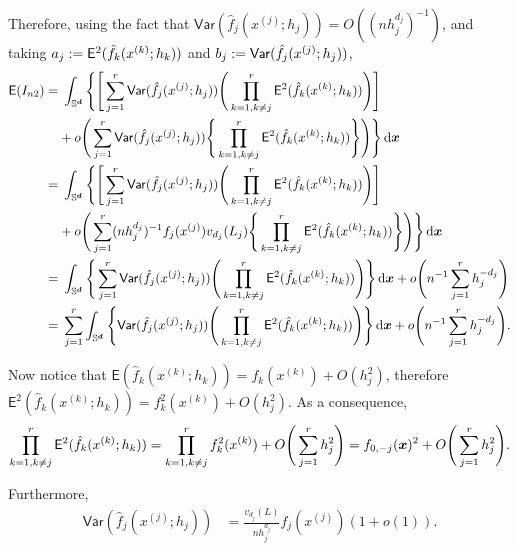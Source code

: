 \documentclass{article}
\begin{document}
Therefore, using the fact that $\mathsf{Var} (\hat{f}_j(x^{(j)};h_j)) = O((n h_j^{d_j})^{-1})$, and taking $a_j := \mathsf{E}^2 (\hat{f}_k(x^{(k)};h_k))$ and $b_j := \mathsf{Var} (\hat{f}_j(x^{(j)};h_j))$,
\begin{align*}
     \mathsf{E} (I_{n2}) =&\; \int_{\mathbb{S}^{\boldsymbol{d}}} \Bigg\{ \Bigg[ \sum_{j=1}^{r} \mathsf{Var} (\hat{f}_j(x^{(j)};h_j)) \Bigg( \prod_{k=1,k \ne j}^{r} \mathsf{E}^2 (\hat{f}_k(x^{(k)};h_k)) \Bigg) \Bigg] \\
     & + o \Bigg( \sum_{j=1}^{r} \mathsf{Var} (\hat{f}_j(x^{(j)};h_j)) \Bigg\{ \prod_{k=1,k \ne j}^{r} \mathsf{E}^2 (\hat{f}_k(x^{(k)};h_k)) \Bigg\} \Bigg) \Bigg\} \,\mathrm{d} \boldsymbol{x} \\
     =&\; \int_{\mathbb{S}^{\boldsymbol{d}}} \Bigg\{ \Bigg[ \sum_{j=1}^{r} \mathsf{Var} (\hat{f}_j(x^{(j)};h_j)) \Bigg( \prod_{k=1,k \ne j}^{r} \mathsf{E}^2 (\hat{f}_k(x^{(k)};h_k)) \Bigg) \Bigg] \\
     &+ o \Bigg( \sum_{j=1}^{r} (n h_j^{d_j})^{-1} f_j(x^{(j)}) v_{d_j}(L_j) \Bigg\{ \prod_{k=1,k \ne j}^{r} \mathsf{E}^2 (\hat{f}_k(x^{(k)};h_k)) \Bigg\}  \Bigg) \Bigg\} \,\mathrm{d} \boldsymbol{x} \\
     =&\; \int_{\mathbb{S}^{\boldsymbol{d}}} \Bigg\{ \sum_{j=1}^{r} \mathsf{Var} (\hat{f}_j(x^{(j)};h_j)) \Bigg( \prod_{k=1,k \ne j}^{r} \mathsf{E}^2 (\hat{f}_k(x^{(k)};h_k)) \Bigg) \Bigg\} \,\mathrm{d} \boldsymbol{x} + o \Bigg( n^{-1} \sum_{j=1}^{r} h_j^{-d_j} \Bigg) \\
     =&\; \sum_{j=1}^{r} \int_{\mathbb{S}^{\boldsymbol{d}}} \Bigg\{ \mathsf{Var} (\hat{f}_j(x^{(j)};h_j)) \Bigg( \prod_{k=1,k \ne j}^{r} \mathsf{E}^2 (\hat{f}_k(x^{(k)};h_k)) \Bigg) \Bigg\} \,\mathrm{d} \boldsymbol{x} + o \Bigg( n^{-1} \sum_{j=1}^{r} h_j^{-d_j} \Bigg).
\end{align*}

Now notice that $\mathsf{E} (\hat{f}_k(x^{(k)};h_k)) = f_k(x^{(k)}) + O(h_j^2)$, therefore $\mathsf{E}^2 (\hat{f}_k(x^{(k)};h_k)) = f_k^2(x^{(k)}) + O(h_j^2)$. As a consequence,
\begin{align*}
    \prod_{k=1,k \ne j}^{r} \mathsf{E}^2 (\hat{f}_k(x^{(k)};h_k)) = \prod_{k=1,k \ne j}^{r} f_k^2(x^{(k)}) + O \Bigg( \sum_{j=1}^{r} h_j^2 \Bigg)= f_{0,-j}(\boldsymbol{x})^2+ O \Bigg( \sum_{j=1}^{r} h_j^2 \Bigg).
\end{align*}

Furthermore,
\begin{align*}
    \mathsf{Var} (\hat{f}_j(x^{(j)};h_j)) &= \frac{v_{d_j}(L)}{n h_j^{d_j}} f_j(x^{(j)}) (1 + o(1)).
\end{align*}
\end{document}
